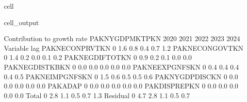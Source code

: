 \documentclass[letterpaper,10pt,english]{jupyterBook}
\begin{document}
\begin{sphinxuseclass}{cell}
\begin{sphinxVerbatimOutput}
\begin{sphinxuseclass}{cell_output}
\begin{sphinxVerbatim}[commandchars=\\\{\}]
 Contribution to growth rate PAKNYGDPMKTPKN
                          2020        2021        2022        2023        2024
Variable       lag                                                            
PAKNECONPRVTKN 0          1.6\PYGZpc{}        0.8\PYGZpc{}        0.4\PYGZpc{}        0.7\PYGZpc{}        1.2\PYGZpc{}
PAKNECONGOVTKN 0          1.4\PYGZpc{}        0.2\PYGZpc{}       \PYGZhy{}0.0\PYGZpc{}        0.1\PYGZpc{}        0.2\PYGZpc{}
PAKNEGDIFTOTKN 0          0.9\PYGZpc{}        0.2\PYGZpc{}        0.1\PYGZpc{}        0.0\PYGZpc{}        0.0\PYGZpc{}
PAKNEGDISTKBKN 0          0.0\PYGZpc{}        0.0\PYGZpc{}        0.0\PYGZpc{}        0.0\PYGZpc{}        0.0\PYGZpc{}
PAKNEEXPGNFSKN 0          0.4\PYGZpc{}        0.4\PYGZpc{}        0.4\PYGZpc{}        0.4\PYGZpc{}        0.5\PYGZpc{}
PAKNEIMPGNFSKN 0         \PYGZhy{}1.5\PYGZpc{}       \PYGZhy{}0.6\PYGZpc{}       \PYGZhy{}0.5\PYGZpc{}       \PYGZhy{}0.5\PYGZpc{}       \PYGZhy{}0.6\PYGZpc{}
PAKNYGDPDISCKN 0          0.0\PYGZpc{}        0.0\PYGZpc{}        0.0\PYGZpc{}        0.0\PYGZpc{}        0.0\PYGZpc{}
PAKADAP        0         \PYGZhy{}0.0\PYGZpc{}       \PYGZhy{}0.0\PYGZpc{}       \PYGZhy{}0.0\PYGZpc{}       \PYGZhy{}0.0\PYGZpc{}       \PYGZhy{}0.0\PYGZpc{}
PAKDISPREPKN   0         \PYGZhy{}0.0\PYGZpc{}       \PYGZhy{}0.0\PYGZpc{}       \PYGZhy{}0.0\PYGZpc{}       \PYGZhy{}0.0\PYGZpc{}       \PYGZhy{}0.0\PYGZpc{}
Total          0          2.8\PYGZpc{}        1.1\PYGZpc{}        0.5\PYGZpc{}        0.7\PYGZpc{}        1.3\PYGZpc{}
Residual       0          4.7\PYGZpc{}        2.8\PYGZpc{}        1.1\PYGZpc{}        0.5\PYGZpc{}        0.7\PYGZpc{}
\end{sphinxVerbatim}

\end{sphinxuseclass}\end{sphinxVerbatimOutput}

\end{sphinxuseclass}
\end{document}
